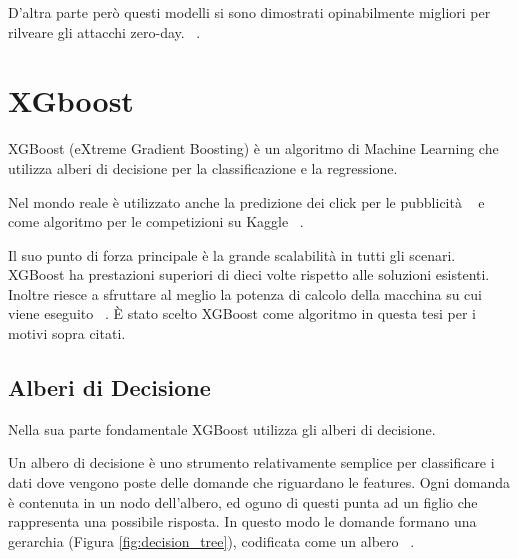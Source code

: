 D'altra parte però questi modelli si sono dimostrati opinabilmente migliori per rilveare gli attacchi zero-day. ~\cite{UnsupervisedAlgorithmsDetect2021}.


\section{XGboost}

XGBoost (eXtreme Gradient Boosting) è un algoritmo di Machine Learning che utilizza alberi di decisione per la classificazione e la regressione. 

Nel mondo reale è utilizzato anche la predizione dei click per le pubblicità  ~\cite{hePracticalLessonsPredicting2014} e come algoritmo per le competizioni su Kaggle ~\cite{chenXGBoostScalableTree2016}.


Il suo punto di forza principale è la grande scalabilità in tutti gli scenari. XGBoost ha prestazioni superiori di dieci volte rispetto alle soluzioni esistenti.
Inoltre riesce a sfruttare al meglio la potenza di calcolo della macchina su cui viene eseguito ~\cite{chenXGBoostScalableTree2016}.
È stato scelto XGBoost come algoritmo in questa tesi per i motivi sopra citati.

\subsection{Alberi di Decisione}

Nella sua parte fondamentale XGBoost utilizza gli alberi di decisione.

Un albero di decisione è uno strumento relativamente semplice per classificare i dati dove vengono poste delle domande che riguardano le features. Ogni domanda è contenuta in un nodo dell'albero, ed oguno di questi punta ad un figlio che rappresenta una possibile risposta.
In questo modo le domande formano una gerarchia (Figura \ref{fig:decision_tree}), codificata come un albero ~\cite{kingsfordWhatAreDecision2008}.


